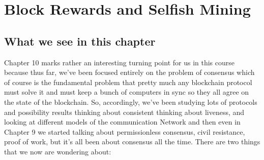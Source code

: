 \chapter{Block Rewards and Selfish Mining}


\section{What we see in this chapter}
Chapter 10 marks rather
an interesting turning point for us
in this course because
thus far, we've been focused
entirely on the problem of consensus
which of course is the
fundamental problem that pretty much any
blockchain protocol must solve it and must
keep a bunch of computers in sync so
they all agree on the state of the
blockchain. So, accordingly, we've been
studying lots of protocols and
possibility results
thinking about consistent thinking
about liveness, and looking at
different models of the communication
Network and then even in Chapter 9 we started talking about
permissionless consensus, civil
resistance, proof of work, but it's 
all been about consensus all the time. There are 
two things that
we now are wondering about:\\
